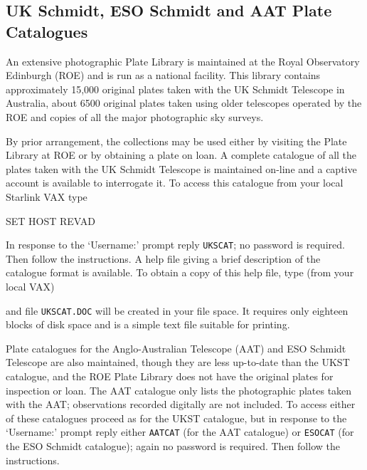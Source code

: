 \documentclass[twoside,11pt,nolof]{starlink}
\begin{document}
\subsection{UK Schmidt, ESO Schmidt and AAT Plate Catalogues
}

An extensive photographic Plate Library is maintained at the Royal
Observatory Edinburgh (ROE) and is run as a national facility. This
library contains approximately 15,000 original plates taken with the
UK Schmidt Telescope in Australia, about 6500 original plates taken
using older telescopes operated by the ROE and copies of all the major
photographic sky surveys.

By prior arrangement, the collections may be used either by visiting the
Plate Library at ROE or by obtaining a plate on loan. A complete
catalogue of all the plates taken with the UK Schmidt Telescope is
maintained on-line and a captive account is available to interrogate it.
To access this catalogue from your local Starlink VAX type

\begin{terminalv}
    SET  HOST  REVAD
\end{terminalv}

In response to the `Username:' prompt reply \verb-UKSCAT-; no password
is required. Then follow the instructions. A help file giving a brief
description of the catalogue format is available. To obtain a copy of
this help file, type (from your local VAX)


and file \verb-UKSCAT.DOC- will be created in your file space. It
requires only eighteen blocks of disk space and is a simple text file
suitable for printing.

Plate catalogues for the Anglo-Australian Telescope (AAT) and ESO
Schmidt Telescope are also maintained, though they are less up-to-date
than the UKST catalogue, and the ROE Plate Library does not have the
original plates for inspection or loan. The AAT catalogue only lists the
photographic plates taken with the AAT; observations recorded digitally
are not included. To access either of these catalogues proceed as for
the UKST catalogue, but in response to the `Username:' prompt reply
either \verb-AATCAT- (for the AAT catalogue) or \verb-ESOCAT- (for the
ESO Schmidt catalogue); again no password is required. Then follow the
instructions.
\end{document}
